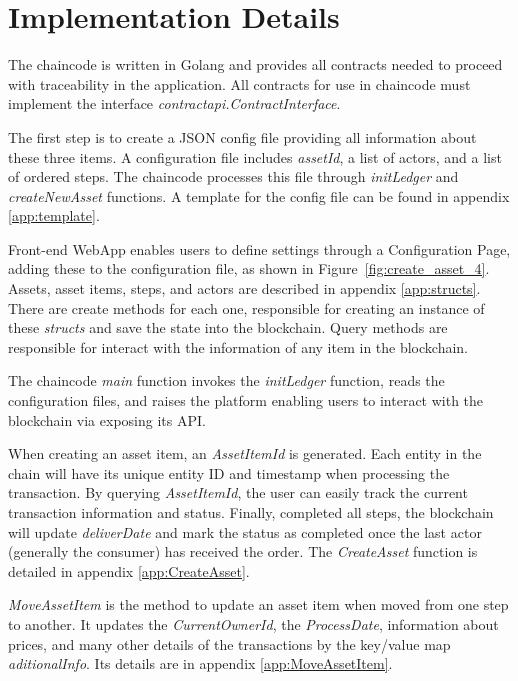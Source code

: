 \section{Implementation Details}\label{sec:Implementation}

The chaincode is written in Golang and provides all contracts needed to proceed with traceability in the application. All contracts for use in chaincode must implement the interface \textit{contractapi.ContractInterface}. 

The first step is to create a JSON config file providing all information about these three items. A configuration file includes \textit{assetId}, a list of actors, and a list of ordered steps. The chaincode processes this file through  \textit{initLedger} and \textit{createNewAsset} functions. A template for the config file can be found in appendix \ref{app:template}.

Front-end WebApp enables users to define settings through a Configuration Page, adding these to the configuration file, as shown in Figure~\ref{fig:create_asset_4}. Assets, asset items, steps, and actors are described in appendix \ref{app:structs}. There are create methods for each one,  responsible for creating an instance of these \textit{structs} and save the state into the blockchain. Query methods are responsible for interact with the information of any item in the blockchain.

The chaincode \textit{main} function invokes the \textit{initLedger} function, reads the configuration files, and raises the platform enabling users to interact with the blockchain via exposing its API.

When creating an asset item, an \textit{AssetItemId} is generated. Each entity in the chain will have its unique entity ID and timestamp when processing the transaction. By querying \textit{AssetItemId}, the user can easily track the current transaction information and status. Finally, completed all steps, the blockchain will update \textit{deliverDate} and mark the status as completed once the last actor (generally the consumer) has received the order. The \textit{CreateAsset} function is detailed in appendix \ref{app:CreateAsset}.


\textit{MoveAssetItem} is the method to update an asset item when moved from one step to another. It updates the \textit{CurrentOwnerId}, the \textit{ProcessDate}, information about prices, and many other details of the transactions by the key/value map \textit{aditionalInfo}. Its details are in appendix \ref{app:MoveAssetItem}.

